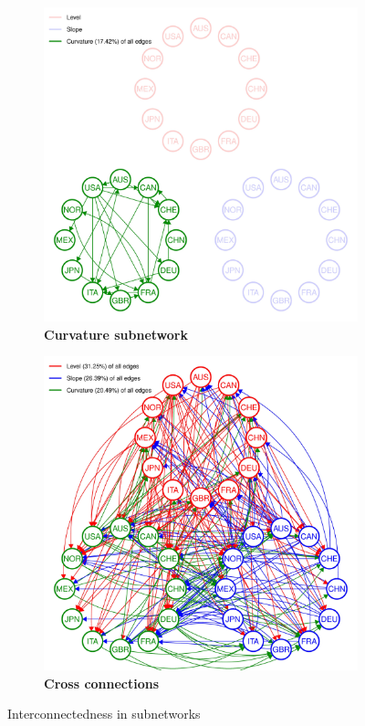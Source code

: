 \documentclass[12pt,bibliography=totoc]{article}
\begin{document}
{\begin{figure}[H]
  \medskip

  \begin{subfigure}[t]{.5\textwidth}
    \centering
    \includegraphics[width=\linewidth]{All_plot_onlycurv_2004-07-01_2019-12-31_0.01-page-001}
    \caption{\textbf{Curvature subnetwork}}
  \end{subfigure}
  \hfill
  \begin{subfigure}[t]{.5\textwidth}
    \centering
    \includegraphics[width=\linewidth]{All_plot_innerempty_2004-07-01_2019-12-31_0.01-page-001}
    \caption{\textbf{Cross connections}}
  \end{subfigure}
  \caption{Interconnectedness in subnetworks}
\end{figure}

}
\end{document}
